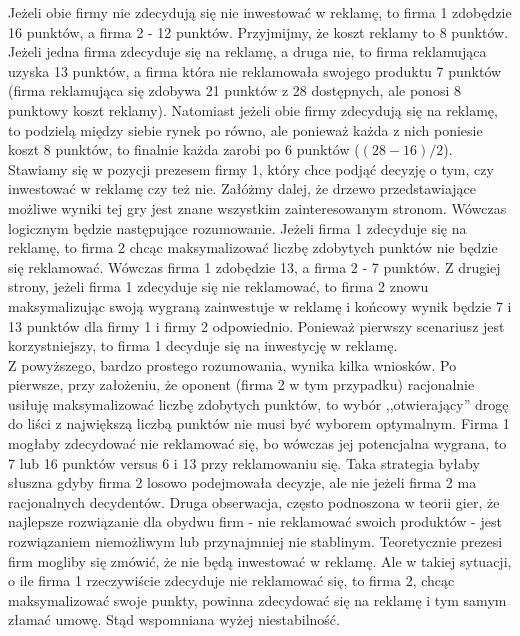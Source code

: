 \documentclass[licencjacka]{pracamgr}
\begin{document}
 Jeżeli obie firmy nie zdecydują się nie inwestować w reklamę, to firma 1 zdobędzie 16 punktów, a firma 2 - 12 punktów. Przyjmijmy, że koszt reklamy to 8 punktów. Jeżeli jedna firma zdecyduje się na reklamę, a druga nie, to firma reklamująca uzyska 13 punktów, a firma która nie reklamowała swojego produktu 7 punktów (firma reklamująca się zdobywa 21 punktów z 28 dostępnych, ale ponosi 8 punktowy koszt reklamy).  Natomiast jeżeli obie firmy zdecydują się na reklamę, to podzielą między siebie rynek po równo, ale ponieważ każda z nich poniesie koszt 8 punktów, to finalnie każda zarobi po 6 punktów ($(28 - 16)/2$).\\
 
 Stawiamy się w pozycji prezesem firmy 1, który chce podjąć decyzję o tym, czy inwestować w reklamę czy też nie. Załóżmy dalej, że drzewo przedstawiające możliwe wyniki tej gry jest znane wszystkim zainteresowanym stronom. Wówczas logicznym będzie następujące rozumowanie. Jeżeli firma 1 zdecyduje się na reklamę, to firma 2 chcąc maksymalizować liczbę zdobytych punktów nie będzie się reklamować. Wówczas firma 1 zdobędzie 13, a firma 2  - 7 punktów.  Z drugiej strony, jeżeli firma 1 zdecyduje się nie reklamować, to firma 2 znowu maksymalizując swoją wygraną zainwestuje w reklamę i końcowy wynik będzie 7 i 13 punktów dla firmy 1 i firmy 2 odpowiednio.  Ponieważ pierwszy scenariusz jest korzystniejszy, to firma 1 decyduje się na inwestycję w reklamę. \\
 
 Z powyższego, bardzo prostego rozumowania, wynika kilka wniosków. Po pierwsze, przy założeniu, że oponent (firma 2 w tym przypadku) racjonalnie usiłuję maksymalizować liczbę zdobytych punktów, to wybór ,,otwierający'' drogę do liści z największą liczbą punktów nie musi być wyborem optymalnym. Firma 1 mogłaby zdecydować nie reklamować się, bo wówczas jej potencjalna wygrana, to 7 lub 16 punktów versus 6 i 13 przy reklamowaniu się. Taka strategia byłaby słuszna gdyby firma 2 losowo podejmowała decyzje, ale nie jeżeli firma  2 ma racjonalnych decydentów. Druga obserwacja, często podnoszona w teorii gier, że najlepsze rozwiązanie dla obydwu firm - nie reklamować swoich produktów  - jest rozwiązaniem niemożliwym lub przynajmniej nie stablinym. Teoretycznie prezesi firm mogliby się zmówić, że nie będą inwestować w reklamę.  Ale w takiej sytuacji, o ile firma 1 rzeczywiście zdecyduje nie reklamować się, to firma 2, chcąc maksymalizować swoje punkty, powinna zdecydować się na reklamę i tym samym złamać umowę. Stąd wspomniana wyżej niestabilność.\\
 
\end{document}

